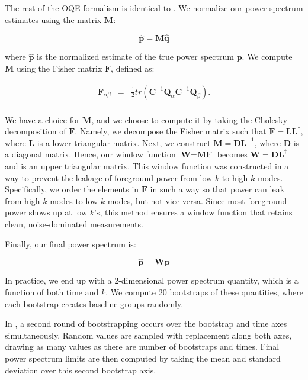 \documentclass[preprint2,numberedappendix,tighten,twocolappendix]{aastex6}  %
\begin{document}
The rest of the OQE formalism is identical to \citet{ali_et_al2015}. We normalize our power spectrum estimates using the matrix $\textbf{M}$:

\begin{equation}
\hat{\textbf{p}} = \textbf{M}\hat{\textbf{q}}
\end{equation}

where $\hat{\textbf{p}}$ is the normalized estimate of the true power spectrum $\textbf{p}$. We compute $\textbf{M}$ using the Fisher matrix $\textbf{F}$, defined as:

\begin{eqnarray}
\textbf{F}_{\alpha\beta} &=& \frac{1}{2}tr(\textbf{C}^{-1}\textbf{Q}_{\alpha}\textbf{C}^{-1}\textbf{Q}_{\beta}). \\
\end{eqnarray}

We have a choice for $\textbf{M}$, and we choose to compute it by taking the Cholesky decomposition of $\textbf{F}$. Namely, we decompose the Fisher matrix such that $\textbf{F} = \textbf{L}\textbf{L}^{\dagger}$, where $\textbf{L}$ is a lower triangular matrix. Next, we construct $\textbf{M} = \textbf{D}\textbf{L}^{-1}$, where \textbf{D} is a diagonal matrix. Hence, our window function $\textbf{W} = \textbf{MF}$ becomes $\textbf{W} = \textbf{D}\textbf{L}^{\dagger}$ and is an upper triangular matrix. This window function was constructed in a way to prevent the leakage of foreground power from low $k$ to high $k$ modes. Specifically, we order the elements in $\textbf{F}$ in such a way so that power can leak from high $k$ modes to low $k$ modes, but not vice versa. Since most foreground power shows up at low $k$'s, this method ensures a window function that retains clean, noise-dominated measurements.

Finally, our final power spectrum is:

\begin{equation}
\hat{\textbf{p}} = \textbf{Wp}
\end{equation}

In practice, we end up with a 2-dimensional power spectrum quantity, which is a function of both time and $k$. We compute $20$ bootstraps of these quantities, where each bootstrap creates baseline groups randomly. 

In \citet{ali_et_al2015}, a second round of bootstrapping occurs over the bootstrap and time axes simultaneously. Random values are sampled with replacement along both axes, drawing as many values as there are number of bootstraps and times. Final power spectrum limits are then computed by taking the mean and standard deviation over this second bootstrap axis. 
\end{document}
